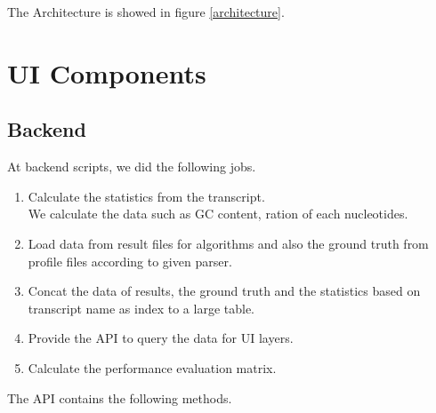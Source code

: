 \documentclass[11pt,letter]{article}
\begin{document}
The Architecture is showed in figure \ref{architecture}.

\section {UI Components}

\subsection {Backend}
At backend scripts, we did the following jobs.
\begin{enumerate}
\item Calculate the statistics from the transcript. \\
We calculate the data such as GC content, ration of each nucleotides.
\item Load data from result files for algorithms and also the ground truth from profile files according to given parser.
\item Concat the data of results, the ground truth and the statistics based on transcript name as index to a large table.
\item Provide the API to query the data for UI layers.
\item Calculate the performance evaluation matrix.
\end{enumerate}
The API contains the following methods.
\end{document}
